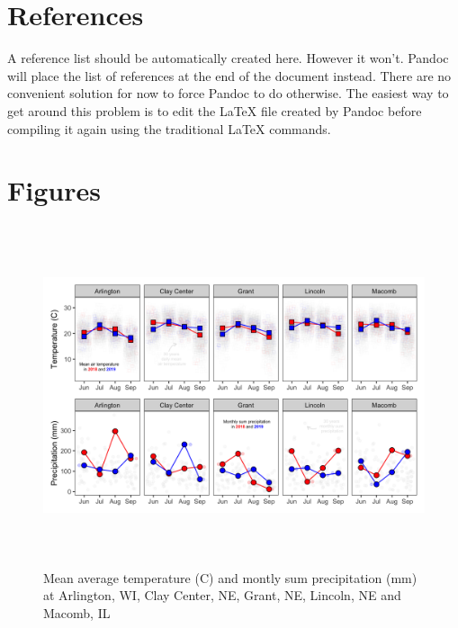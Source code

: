 \documentclass[utf8]{frontiersSCNS}
\begin{document}
\hypertarget{references}{%
\section{References}\label{references}}

A reference list should be automatically created here. However it won't.
Pandoc will place the list of references at the end of the document
instead. There are no convenient solution for now to force Pandoc to do
otherwise. The easiest way to get around this problem is to edit the
LaTeX file created by Pandoc before compiling it again using the
traditional LaTeX commands.

\hypertarget{figures}{%
\section*{Figures}\label{figures}}

\begin{figure}

{\centering \includegraphics[width=160mm,height=100mm]{../data analysis/weather/Figure 1} 

}

\caption{Mean average temperature (C) and montly sum precipitation (mm) at Arlington, WI, Clay Center, NE, Grant, NE, Lincoln, NE and Macomb, IL}\label{fig:Figure-1}
\end{figure}
\end{document}

